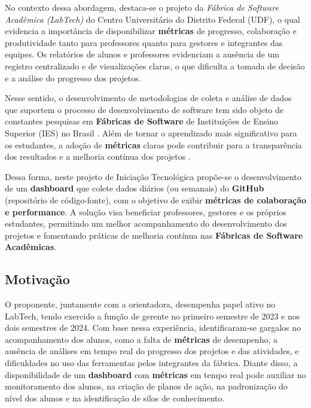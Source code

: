 \documentclass[
	12pt,           %
	openright,      %
	oneside,        %
	a4paper,        %
	brazil          %
]{abntex2}
\begin{document}
No contexto dessa abordagem, destaca-se o projeto da \emph{Fábrica de Software Acadêmica (LabTech)} do Centro Universitário do Distrito Federal (UDF), o qual evidencia a importância de disponibilizar \textbf{métricas} de progresso, colaboração e produtividade tanto para professores quanto para gestores e integrantes das equipes. Os relatórios de alunos e professores evidenciam a ausência de um registro centralizado e de visualizações claras, o que dificulta a tomada de decisão e a análise do progresso dos projetos.

Nesse sentido, o desenvolvimento de metodologias de coleta e análise de dados que suportem o processo de desenvolvimento de software tem sido objeto de constantes pesquisas em \textbf{Fábricas de Software}  de Instituições de Ensino Superior (IES) no Brasil \cite{romanha2016modelo, neto2017relato}. Além de tornar o aprendizado mais significativo para os estudantes, a adoção de \textbf{métricas} claras pode contribuir para a transparência dos resultados e a melhoria contínua dos projetos \cite{oliveira2017conduccao, almeida2006liccoes}.

Dessa forma, neste projeto de Iniciação Tecnológica propõe-se o desenvolvimento de um \textbf{dashboard} que colete dados diários (ou semanais) do \textbf{GitHub} (repositório de código-fonte), com o objetivo de exibir \textbf{métricas de colaboração e performance}. A solução visa beneficiar professores, gestores e os próprios estudantes, permitindo um melhor acompanhamento do desenvolvimento dos projetos e fomentando práticas de melhoria contínua nas \textbf{Fábricas de Software Acadêmicas}.

\subsection{Motiva\c{c}\~{a}o}
O proponente, juntamente com a orientadora, desempenha papel ativo no LabTech, tendo exercido a função de gerente no primeiro semestre de 2023 e nos dois semestres de 2024. Com base nessa experiência, identificaram-se gargalos no acompanhamento dos alunos, como a falta de \textbf{métricas} de desempenho, a ausência de análises em tempo real do progresso dos projetos e das atividades, e dificuldades no uso das ferramentas pelos integrantes da fábrica. Diante disso, a disponibilidade de um \textbf{dashboard} com \textbf{métricas} em tempo real pode auxiliar no monitoramento dos alunos, na criação de planos de ação, na padronização do nível dos alunos e na identificação de silos de conhecimento.
\end{document}
